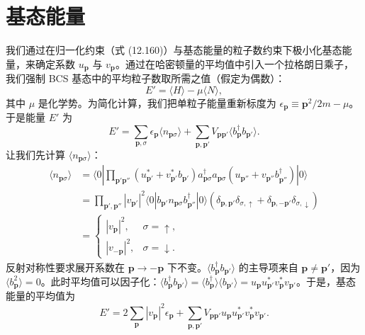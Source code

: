 \section{基态能量}

我们通过在归一化约束（式 (12.160)）与基态能量的粒子数约束下极小化基态能量，来确定系数 $u_{\mathbf p}$ 与 $v_{\mathbf p}$。通过在哈密顿量的平均值中引入一个拉格朗日乘子，我们强制 BCS 基态中的平均粒子数取所需之值（假定为偶数）：
\begin{equation*}
E'=\langle H\rangle-\mu\langle N\rangle, \tag{12.179}
\end{equation*}
其中 $\mu$ 是化学势。为简化计算，我们把单粒子能量重新标度为 $\epsilon_{\mathbf p}\equiv\mathbf p^2/2m-\mu$。于是能量 $E'$ 为
\begin{equation*}
E'=\sum_{\mathbf p,\sigma}\epsilon_{\mathbf p}\langle n_{\mathbf p\sigma}\rangle+\sum_{\mathbf p,\mathbf p'}V_{\mathbf p\mathbf p'}\langle b^\dagger_{\mathbf p}b_{\mathbf p'}\rangle. \tag{12.180}
\end{equation*}
让我们先计算 $\langle n_{\mathbf p\sigma}\rangle$：
\begin{align*}
\langle n_{\mathbf p\sigma}\rangle&=\langle 0|\prod_{\mathbf p'\mathbf p''}\left(u^*_{\mathbf p'}+v^*_{\mathbf p'}b_{\mathbf p'}\right)a^\dagger_{\mathbf p\sigma}a_{\mathbf p\sigma}\left(u_{\mathbf p''}+v_{\mathbf p''}b^\dagger_{\mathbf p''}\right)|0\rangle\\
&=\prod_{\mathbf p',\mathbf p''}\left|v_{\mathbf p'}\right|^2\langle 0|b_{\mathbf p'}n_{\mathbf p\sigma}b^\dagger_{\mathbf p''}|0\rangle\left(\delta_{\mathbf p,\mathbf p'}\delta_{\sigma,\uparrow}+\delta_{\mathbf p,-\mathbf p'}\delta_{\sigma,\downarrow}\right)\\
&=\begin{cases}\left|v_{\mathbf p}\right|^2, & \sigma=\uparrow,\\ \left|v_{-\mathbf p}\right|^2, & \sigma=\downarrow.\end{cases} \tag{12.181}
\end{align*}
反射对称性要求展开系数在 $\mathbf p\to-\mathbf p$ 下不变。$\langle b^\dagger_{\mathbf p}b_{\mathbf p'}\rangle$ 的主导项来自 $\mathbf p\neq\mathbf p'$，因为 $\langle b^2_{\mathbf p}\rangle=0$。此时平均值可以因子化：$\langle b^\dagger_{\mathbf p}b_{\mathbf p'}\rangle=\langle b^\dagger_{\mathbf p}\rangle\langle b_{\mathbf p'}\rangle=u_{\mathbf p}u^*_{\mathbf p'}v^*_{\mathbf p}v_{\mathbf p'}$。于是，基态能量的平均值为
\begin{equation*}
E'=2\sum_{\mathbf p}\left|v_{\mathbf p}\right|^2\epsilon_{\mathbf p}+\sum_{\mathbf p,\mathbf p'}V_{\mathbf p\mathbf p'}u_{\mathbf p}u^*_{\mathbf p'}v^*_{\mathbf p}v_{\mathbf p'}. \tag{12.182}
\end{equation*}
